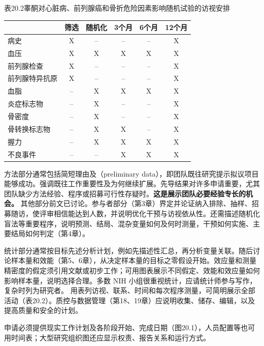 \begin{bookbox}{表20.2\quad 睾酮对心脏病、前列腺癌和骨折危险因素影响随机试验的访视安排}
\small\begin{tabularx}{\linewidth}{Yccccc}\toprule
 & 筛选 & 随机化 & 3个月 & 6个月 & 12个月\\\midrule
{}病史 &X&--&--&--&X\\
血压 &X&X&X&X&X\\
前列腺检查 &X&--&--&--&X\\
前列腺特异抗原 &X&--&--&--&X\\
血脂 &--&X&X&X&X\\
炎症标志物 &--&X&--&--&X\\
骨密度 &--&X&--&--&X\\
骨转换标志物 &--&X&X&--&X\\
握力 &--&X&X&X&X\\
不良事件 &--&--&X&X&X\\\bottomrule
\end{tabularx}
\end{bookbox}

方法部分通常包括简短理由及（preliminary data），即团队既往研究提示拟议项目能够成功。强调既往工作重要性及为何继续扩展。先导结果对许多申请重要，尤其团队缺少方法经验、程序或招募可行性存疑时。\textbf{这是展示团队必要经验专长的机会。}
其他部分前文已讨论。参与者部分（第3章）界定并论证纳入排除、抽样、招募随访，使评审相信能达到人数，并说明优化干预与访视依从性。还需描述随机化盲法等重要程序，说明预测、结局、混杂变量如何及何时测量，干预如何实施、主要结局如何判定（第4章）。

统计部分通常按目标先述分析计划，例如先描述性汇总，再分析变量关联。随后讨论样本量和效能（第5、6章），从决定样本量的目标之零假设开始。效应量和测量精密度的假定须引用文献或初步工作；可用图表展示不同假定、效能和效应量如何影响样本量，说明选择合理。多数 NIH 小组很重视统计，应请统计师参与写作，复杂时列为研究者。
用表列访视、联系、时间和每次程序测量，可简明展示全部活动（表20.2）。质控与数据管理（第18、19章）应说明收集、储存、编辑，以及提高质量和安全的计划。

申请必须提供现实工作计划及各阶段开始、完成日期（图20.1），人员配置等也可用时间表；大型研究组织图还应显示权责、报告关系和运行方式。


